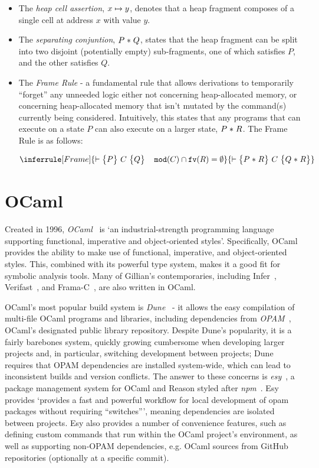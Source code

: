 \begin{itemize}
  \item The \textit{heap cell assertion}, $x \mapsto y$, denotes that a heap
  fragment composes of a single cell at address $x$ with value $y$.

  \item The \textit{separating conjuntion}, $P \mathrel{*} Q$, states that the heap
  fragment can be split into two disjoint (potentially empty) sub-fragments,
  one of which satisfies $P$, and the other satisfies $Q$.

  \item The \textit{Frame Rule} - a fundamental rule that allows derivations to
  temporarily ``forget'' any unneeded logic either not concerning
  heap-allocated memory, or concerning heap-allocated memory that isn't mutated
  by the command(s) currently being considered. Intuitively, this states that
  any programs that can execute on a state $P$ can also execute on a larger
  state, $P \mathrel{*} R$. The Frame Rule is as follows:

  $$
    \inferrule[Frame]{
      \triple{P}{C}{Q} \quad \mathtt{mod}(C) \cap \mathtt{fv}(R) =
      \emptyset}{\triple{P \lstar R}{C}{Q \lstar R}
    }
  $$
\end{itemize}


\section{OCaml}

Created in 1996, \textit{OCaml}~\cite{ocaml} is `an industrial-strength
programming language supporting functional, imperative and object-oriented
styles'. Specifically, OCaml provides the ability to make use of functional,
imperative, and object-oriented styles. This, combined with its powerful type
system, makes it a good fit for symbolic analysis tools. Many of Gillian's
contemporaries, including Infer~\cite{infer}, Verifast~\cite{verifast-paper,
verifast-repo}, and Frama-C~\cite{frama-c}, are also written in OCaml.

OCaml's most popular build system is \textit{Dune}~\cite{dune} - it allows the
easy compilation of multi-file OCaml programs and libraries, including
dependencies from \textit{OPAM}~\cite{opam}, OCaml's designated public library
repository. Despite Dune's popularity, it is a fairly barebones system, quickly
growing cumbersome when developing larger projects and, in particular,
switching development between projects; Dune requires that OPAM dependencies
are installed system-wide, which can lead to inconsistent builds and version
conflicts. The answer to these concerns is \textit{esy}~\cite{esy}, a package
management system for OCaml and Reason styled after \textit{npm}~\cite{npm}.
Esy provides `provides a fast and powerful workflow for local development of
opam packages without requiring ``switches''', meaning dependencies are isolated
between projects. Esy also provides a number of convenience features, such as
defining custom commands that run within the OCaml project's environment, as
well as supporting non-OPAM dependencies, e.g. OCaml sources from GitHub
repositories (optionally at a specific commit).



